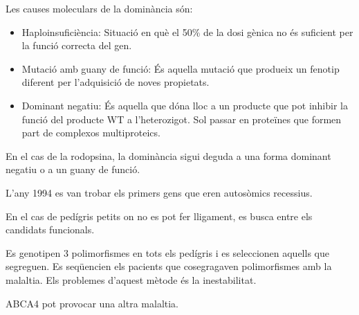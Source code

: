 Les causes moleculars de la dominància són: 
\begin{itemize}
\item Haploinsuficiència: Situació en què el 50\% de la dosi gènica no
  és suficient per la funció correcta del gen.

\item Mutació amb guany de funció: És aquella mutació que produeix un
  fenotip diferent per l'adquisició de noves propietats.

\item Dominant negatiu: És aquella que dóna lloc a un producte que pot
  inhibir la funció del producte WT a l'heterozigot. Sol passar en
  proteïnes que formen part de complexos multiproteics.
\end{itemize}

En el cas de la rodopsina, la dominància sigui deguda a una forma
dominant negatiu o a un guany de funció.

L'any 1994 es van trobar els primers gens que eren autosòmics
recessius.

En el cas de pedígris petits on no es pot fer lligament, es busca
entre els candidats funcionals.

Es genotipen 3 polimorfismes en tots els pedígris i es seleccionen
aquells que segreguen. Es seqüencien els pacients que cosegragaven
polimorfismes amb la malaltia. Els problemes d'aquest mètode és la
inestabilitat. 

ABCA4 pot provocar una altra malaltia. 

